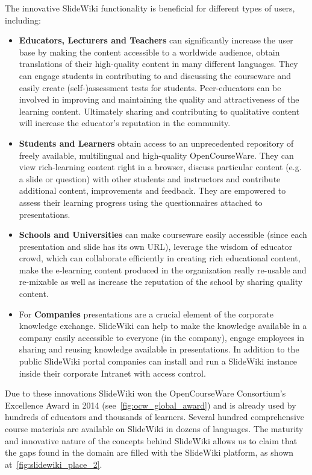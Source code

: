 \documentclass[ngerman,UKenglish,table]{scrbook}
\begin{document}
The innovative SlideWiki functionality is beneficial for different types of users, including:
\begin{itemize}
\item \textbf{Educators, Lecturers and Teachers} can significantly increase the user base by making the content accessible to a worldwide audience, obtain translations of their high-quality content in many different languages.
They can engage students in contributing to and discussing the courseware and easily create (self-)assessment tests for students.
Peer-educators can be involved in improving and maintaining the quality and attractiveness of the learning content.
Ultimately sharing and contributing to qualitative content will increase the educator’s reputation in the community.
\item\textbf{ Students and Learners} obtain access to an unprecedented repository of freely available, multilingual and high-quality OpenCourseWare.
They can view rich-learning content right in a browser, discuss particular content (e.g. a slide or question) with other students and instructors and contribute additional content, improvements and feedback.
They are empowered to assess their learning progress using the questionnaires attached to presentations.
\item \textbf{Schools and Universities} can make courseware easily accessible (since each presentation and slide has its own URL), leverage the wisdom of educator crowd, which can collaborate efficiently in creating rich educational content, make the e-learning content produced in the organization really re-usable and re-mixable as well as increase the reputation of the school by sharing quality content.
\item For \textbf{Companies} presentations are a crucial element of the corporate knowledge exchange.
SlideWiki can help to make the knowledge available in a company easily accessible to everyone (in the company), engage employees in sharing and reusing knowledge available in presentations.
In addition to the public SlideWiki portal companies can install and run a SlideWiki instance inside their corporate Intranet with access control.
\end{itemize}

Due to these innovations SlideWiki won the OpenCourseWare Consortium’s Excellence Award in 2014 (see~\autoref{fig:ocw_global_award}) and is already used by hundreds of educators and thousands of learners.
Several hundred comprehensive course materials are available on SlideWiki in dozens of languages.
The maturity and innovative nature of the concepts behind SlideWiki allows us to claim that the gaps found in the domain are filled with the SlideWiki platform, as shown at~\autoref{fig:slidewiki_place_2}.
\end{document}
